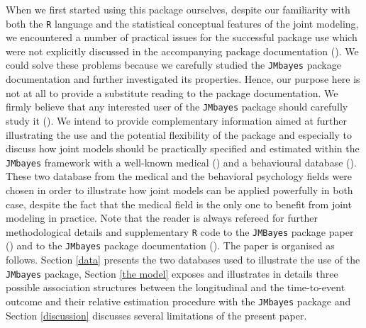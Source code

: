 \documentclass[12pt]{article}
\begin{document}
When we first started using this package ourselves, despite our familiarity with both the \texttt{R} language and the statistical conceptual features of the joint modeling, we encountered a number of practical issues for the successful package use which were not explicitly discussed in the accompanying package documentation (\cite{JMbayes}). We could  solve these problems because we carefully studied the \texttt{JMbayes} package documentation and further investigated its properties. Hence, our purpose here is not at all to provide a substitute reading to the package documentation. We firmly believe that any interested user of the \texttt{JMbayes} package should carefully study it (\cite{JMbayes}). We intend to provide complementary information aimed at further illustrating the use and the potential flexibility of the package and especially to discuss how joint models should be practically specified and estimated within the \texttt{JMbayes} framework with a well-known medical (\cite{murtaugh1994primary}) and a behavioural database (\cite{Rabbitt2004}).
These two database from the medical and the behavioral psychology fields were chosen in order to illustrate how joint models can be applied powerfully in both case, despite the fact that the medical field is the only one to benefit from joint modeling in practice. Note that the reader is always refereed for further methodological details and supplementary \texttt{R} code to the \texttt{JMBayes} package paper (\cite{JMbayes}) and to the \texttt{JMbayes} package documentation (\cite{rizopoulos2017package}). The paper is organised as follows. Section \ref{data} presents the two databases used to illustrate the use of the \texttt{JMbayes} package, Section \ref{the model} exposes and illustrates in details three possible association structures between the longitudinal and the time-to-event outcome and their relative estimation procedure with the \texttt{JMbayes} package and Section \ref{discussion} discusses several limitations of the present paper.



\end{document}

